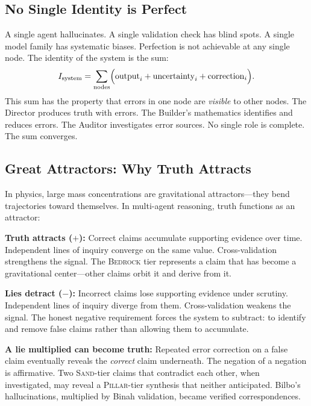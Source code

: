 \documentclass[11pt]{article}
\theoremstyle{definition}
\theoremstyle{remark}
\newcommand{\BEDROCK}{\textsc{Bedrock}}
\newcommand{\PILLAR}{\textsc{Pillar}}
\newcommand{\SAND}{\textsc{Sand}}
\begin{document}
\subsection{No Single Identity is Perfect}
\label{sec:no-single-identity}

A single agent hallucinates.  A single validation check has blind spots.  A
single model family has systematic biases.  Perfection is not achievable at any
single node.  The identity of the system is the sum:
\begin{equation}
  I_{\mathrm{system}}
  = \sum_{\text{nodes}} \Bigl(
      \mathrm{output}_i + \mathrm{uncertainty}_i + \mathrm{correction}_i
    \Bigr).
  \label{eq:system-identity}
\end{equation}
This sum has the property that errors in one node are \emph{visible} to other
nodes.  The Director produces truth with errors.  The Builder's mathematics
identifies and reduces errors.  The Auditor investigates error sources.  No
single role is complete.  The sum converges.

\subsection{Great Attractors: Why Truth Attracts}
\label{sec:attractors}

In physics, large mass concentrations are gravitational attractors---they bend
trajectories toward themselves.  In multi-agent reasoning, truth functions as an
attractor:

\medskip
\noindent\textbf{Truth attracts ($+$):}  Correct claims accumulate supporting
evidence over time.  Independent lines of inquiry converge on the same value.
Cross-validation strengthens the signal.  The \BEDROCK{} tier represents a claim
that has become a gravitational center---other claims orbit it and derive from it.

\medskip
\noindent\textbf{Lies detract ($-$):}  Incorrect claims lose supporting evidence
under scrutiny.  Independent lines of inquiry diverge from them.
Cross-validation weakens the signal.  The honest negative requirement forces the
system to subtract: to identify and remove false claims rather than allowing them
to accumulate.

\medskip
\noindent\textbf{A lie multiplied can become truth:}  Repeated error correction
on a false claim eventually reveals the \emph{correct} claim underneath.  The
negation of a negation is affirmative.  Two \SAND-tier claims that contradict each
other, when investigated, may reveal a \PILLAR-tier synthesis that neither
anticipated.  Bilbo's hallucinations, multiplied by Binah validation, became
verified correspondences.
\end{document}
